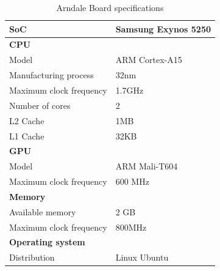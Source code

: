 \begin{table}[h]
  \begin{tabular}{ll}
    \toprule
    \textbf{SoC}              & Samsung Exynos 5250 \\
    \midrule
    \textbf{CPU}              &  \\
    Model                     & ARM Cortex-A15 \\
    Manufacturing process     & 32nm \\
    Maximum clock frequency   & 1.7GHz \\
    Number of cores           & 2 \\
    L2 Cache                  & 1MB \\
    L1 Cache                  & 32KB \\
    \midrule
    \textbf{GPU}              &  \\
    Model                     & ARM Mali-T604 \\
    Maximum clock frequency   & 600 MHz \\
    \midrule
    \textbf{Memory}           &  \\
    Available memory          & 2 GB \\
    Maximum clock frequency   & 800MHz \\
    \midrule
    \textbf{Operating system} &  \\
    Distribution              & Linux Ubuntu \\
    \bottomrule
  \end{tabular}
  \caption{Arndale Board specifications\label{overflow}}
\end{table}


